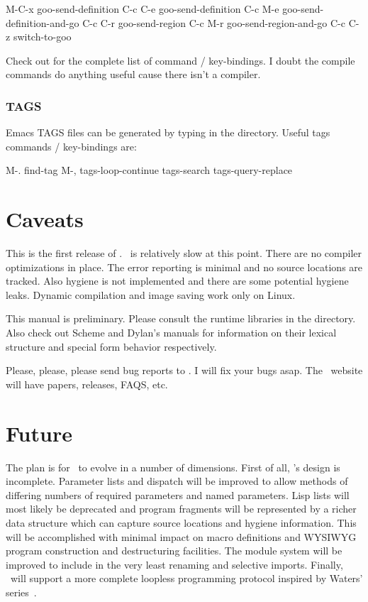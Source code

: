 \documentclass[twoside,twocolumn,9pt]{extarticle}
\begin{document}
\begin{exv}
M-C-x   goo-send-definition
C-c C-e goo-send-definition
C-c M-e goo-send-definition-and-go
C-c C-r goo-send-region
C-c M-r goo-send-region-and-go
C-c C-z switch-to-goo
\end{exv}

Check out  for the complete list of command /
key-bindings. I doubt the compile commands do anything useful cause
there isn't a compiler.

\subsubsection{TAGS}

Emacs TAGS files can be generated by typing  in
the  directory.  Useful tags commands / key-bindings are:

\begin{exv}
M-.     find-tag
M-,     tags-loop-continue
        tags-search
        tags-query-replace
\end{exv}

\section{Caveats} 

This is the first release of \goo.
\goo\ is relatively slow at this point.  There are no compiler
optimizations in place.  The error reporting is minimal and no source
locations are tracked.  Also hygiene is not implemented and there are
some potential hygiene leaks.  Dynamic compilation and image saving
work only on Linux.

This manual is preliminary.  Please consult the runtime
libraries in the  directory.  Also check out Scheme and Dylan's
manuals for information on their lexical structure and special form
behavior respectively.

Please, please, please send bug reports to .  I
will fix your bugs asap.  The \goo\ website 
will have papers, releases, FAQS, etc.

\section{Future}

The plan is for \goo\ to evolve in a number of dimensions.  First of
all, \goo's design is incomplete.  Parameter lists and dispatch will
be improved to allow methods of differing numbers of required
parameters and named parameters.  Lisp lists will most likely be
deprecated and program fragments will be represented by a richer data
structure which can capture source locations and hygiene information.
This will be accomplished with minimal impact on macro definitions and
WYSIWYG program construction and destructuring facilities.  The module
system will be improved to include in the very least renaming and selective
imports. Finally, \goo\ will support a more complete loopless
programming protocol inspired by Waters'
series~\cite{Waters:1991:ATS}.
\end{document}
